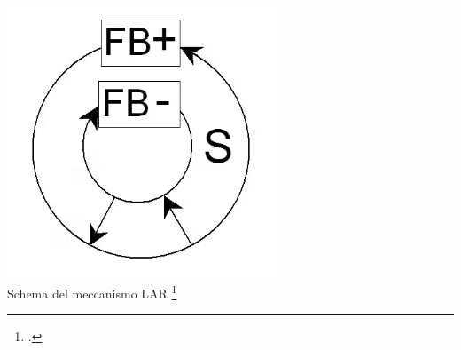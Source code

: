 \begin{center}
\vspace{0.5cm}
\includegraphics[width=8cm]{figures/controlled_larsen_feedback.png} \\
{Schema del meccanismo LAR \footcite{di_scipio_relational_2022}} \\ 
\vspace{0.5cm}
\end{center}

